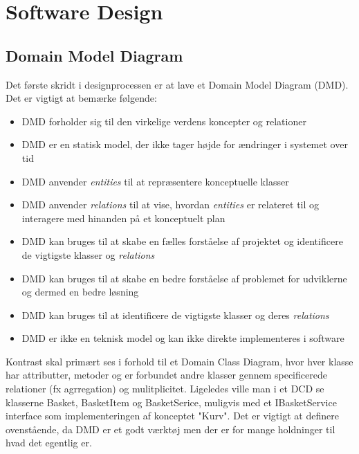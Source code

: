 \chapter{Software Design}
\label{chapter:software-design}

\section{Domain Model Diagram}
Det første skridt i designprocessen er at lave et Domain Model Diagram (DMD). Det er vigtigt at bemærke følgende:
\begin{itemize}
    \item DMD forholder sig til den virkelige verdens koncepter og relationer
    \item DMD er en statisk model, der ikke tager højde for ændringer i systemet over tid
    \item DMD anvender \emph{entities} til at repræsentere konceptuelle klasser
    \item DMD anvender \emph{relations} til at vise, hvordan \emph{entities} er relateret til og interagere med hinanden på et konceptuelt plan
    \item DMD kan bruges til at skabe en fælles forståelse af projektet og identificere de vigtigste klasser og \emph{relations}
    \item DMD kan bruges til at skabe en bedre forståelse af problemet for udviklerne og dermed en bedre løsning
    \item DMD kan bruges til at identificere de vigtigste klasser og deres \emph{relations}
    \item DMD er ikke en teknisk model og kan ikke direkte implementeres i software
\end{itemize} 
Kontrast skal primært ses i forhold til et Domain Class Diagram, hvor hver klasse har attributter, metoder og er forbundet andre klasser gennem specificerede relationer (fx agrregation) og mulitplicitet. 
Ligeledes ville man i et DCD se klasserne Basket, BasketItem og BasketSerice, muligvis med et IBasketService interface som implementeringen af konceptet "Kurv".
Det er vigtigt at definere ovenstående, da DMD er et godt værktøj men der er for mange holdninger til hvad det egentlig er.
